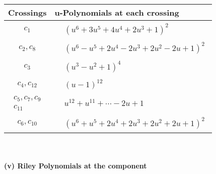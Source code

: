 \documentclass[1p]{elsarticle_modified}
\theoremstyle{definition}
\begin{document}
\begin{tabular}{m{50pt}|m{274pt}}
Crossings & \hspace{64pt}u-Polynomials at each crossing \\
\hline $$\begin{aligned}c_{1}\end{aligned}$$&$\begin{aligned}
&(u^6+3 u^5+4 u^4+2 u^3+1)^2
\end{aligned}$\\
\hline $$\begin{aligned}c_{2},c_{8}\end{aligned}$$&$\begin{aligned}
&(u^6- u^5+2 u^4-2 u^3+2 u^2-2 u+1)^2
\end{aligned}$\\
\hline $$\begin{aligned}c_{3}\end{aligned}$$&$\begin{aligned}
&(u^3- u^2+1)^4
\end{aligned}$\\
\hline $$\begin{aligned}c_{4},c_{12}\end{aligned}$$&$\begin{aligned}
&(u-1)^{12}
\end{aligned}$\\
\hline $$\begin{aligned}c_{5},c_{7},c_{9}\\c_{11}\end{aligned}$$&$\begin{aligned}
&u^{12}+u^{11}+\cdots-2 u+1
\end{aligned}$\\
\hline $$\begin{aligned}c_{6},c_{10}\end{aligned}$$&$\begin{aligned}
&(u^6+u^5+2 u^4+2 u^3+2 u^2+2 u+1)^2
\end{aligned}$\\
\hline
\end{tabular}\\~\\
\newpage\renewcommand{\arraystretch}{1}
\flushleft \textbf{(v) Riley Polynomials at the component}\newline \\
\end{document}
